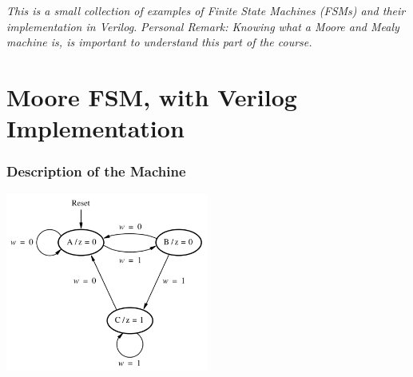 \documentclass[12pt,openany]{book}
\begin{document}
\textit{This is a small collection of examples of Finite State Machines (FSMs) and their implementation in Verilog.
}\newline
\textit{Personal Remark: Knowing what a Moore and Mealy machine is, is important to understand this part of the course.}

\section{Moore FSM, with Verilog Implementation}
\subsubsection*{Description of the Machine}
\begin{center}
	\includegraphics[width=0.5\textwidth]{circuits/17.1.png}
\end{center}
\end{document}
